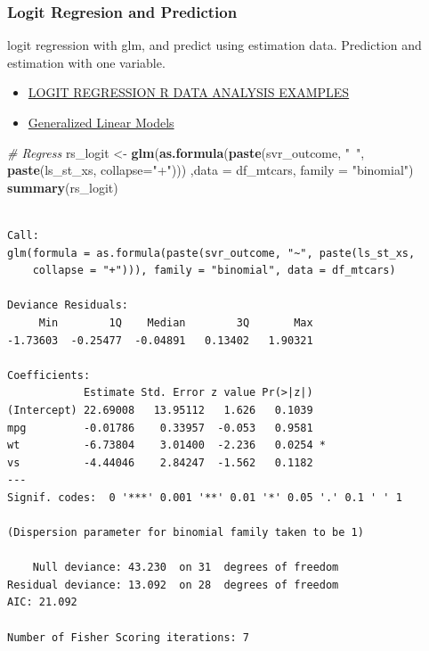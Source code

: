 \documentclass[
]{book}
\newenvironment{Shaded}{\begin{snugshade}}{\end{snugshade}}
\newcommand{\CommentTok}[1]{\textcolor[rgb]{0.56,0.35,0.01}{\textit{#1}}}
\newcommand{\DataTypeTok}[1]{\textcolor[rgb]{0.13,0.29,0.53}{#1}}
\newcommand{\KeywordTok}[1]{\textcolor[rgb]{0.13,0.29,0.53}{\textbf{#1}}}
\newcommand{\NormalTok}[1]{#1}
\newcommand{\StringTok}[1]{\textcolor[rgb]{0.31,0.60,0.02}{#1}}
\providecommand{\tightlist}{%
  \setlength{\itemsep}{0pt}\setlength{\parskip}{0pt}}
\begin{document}
\hypertarget{logit-regresion-and-prediction}{%
\subsubsection{Logit Regresion and Prediction}\label{logit-regresion-and-prediction}}

logit regression with glm, and predict using estimation data. Prediction and estimation with one variable.

\begin{itemize}
\tightlist
\item
  \href{https://stats.idre.ucla.edu/r/dae/logit-regression/}{LOGIT REGRESSION R DATA ANALYSIS EXAMPLES}
\item
  \href{https://www.statmethods.net/advstats/glm.html}{Generalized Linear Models}
\end{itemize}

\begin{Shaded}
\begin{Highlighting}[]
\CommentTok{# Regress}
\NormalTok{rs_logit <-}\StringTok{ }\KeywordTok{glm}\NormalTok{(}\KeywordTok{as.formula}\NormalTok{(}\KeywordTok{paste}\NormalTok{(svr_outcome, }\StringTok{"~"}\NormalTok{, }\KeywordTok{paste}\NormalTok{(ls_st_xs, }\DataTypeTok{collapse=}\StringTok{"+"}\NormalTok{)))}
\NormalTok{                ,}\DataTypeTok{data =}\NormalTok{ df_mtcars, }\DataTypeTok{family =} \StringTok{"binomial"}\NormalTok{)}
\KeywordTok{summary}\NormalTok{(rs_logit)}
\end{Highlighting}
\end{Shaded}

\begin{verbatim}

Call:
glm(formula = as.formula(paste(svr_outcome, "~", paste(ls_st_xs, 
    collapse = "+"))), family = "binomial", data = df_mtcars)

Deviance Residuals: 
     Min        1Q    Median        3Q       Max  
-1.73603  -0.25477  -0.04891   0.13402   1.90321  

Coefficients:
            Estimate Std. Error z value Pr(>|z|)  
(Intercept) 22.69008   13.95112   1.626   0.1039  
mpg         -0.01786    0.33957  -0.053   0.9581  
wt          -6.73804    3.01400  -2.236   0.0254 *
vs          -4.44046    2.84247  -1.562   0.1182  
---
Signif. codes:  0 '***' 0.001 '**' 0.01 '*' 0.05 '.' 0.1 ' ' 1

(Dispersion parameter for binomial family taken to be 1)

    Null deviance: 43.230  on 31  degrees of freedom
Residual deviance: 13.092  on 28  degrees of freedom
AIC: 21.092

Number of Fisher Scoring iterations: 7
\end{verbatim}
\end{document}

